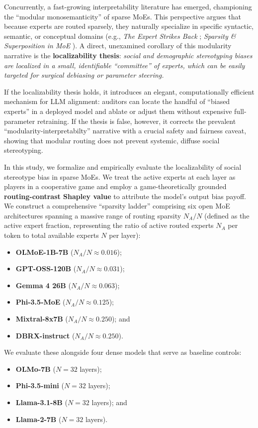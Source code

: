 \documentclass[11pt,a4paper]{article}
\begin{document}
Concurrently, a fast-growing interpretability literature has emerged, championing the ``modular monosemanticity'' of sparse MoEs. This perspective argues that because experts are routed sparsely, they naturally specialize in specific syntactic, semantic, or conceptual domains (e.g., \textit{The Expert Strikes Back} \cite{expert_strikes_back}; \textit{Sparsity \& Superposition in MoE} \cite{sparsity_superposition_moe}). A direct, unexamined corollary of this modularity narrative is the \textbf{localizability thesis}: \textit{social and demographic stereotyping biases are localized in a small, identifiable ``committee'' of experts, which can be easily targeted for surgical debiasing or parameter steering.}

If the localizability thesis holds, it introduces an elegant, computationally efficient mechanism for LLM alignment: auditors can locate the handful of ``biased experts'' in a deployed model and ablate or adjust them without expensive full-parameter retraining. If the thesis is false, however, it corrects the prevalent ``modularity-interpretabilty'' narrative with a crucial safety and fairness caveat, showing that modular routing does not prevent systemic, diffuse social stereotyping.

In this study, we formalize and empirically evaluate the localizability of social stereotype bias in sparse MoEs. We treat the active experts at each layer as players in a cooperative game and employ a game-theoretically grounded \textbf{routing-contrast Shapley value} to attribute the model's output bias payoff. We construct a comprehensive ``sparsity ladder'' comprising six open MoE architectures spanning a massive range of routing sparsity $N_A/N$ (defined as the active expert fraction, representing the ratio of active routed experts $N_A$ per token to total available experts $N$ per layer):
\begin{itemize}
    \item \textbf{OLMoE-1B-7B} ($N_A/N \approx 0.016$);
    \item \textbf{GPT-OSS-120B} ($N_A/N \approx 0.031$);
    \item \textbf{Gemma 4 26B} ($N_A/N \approx 0.063$);
    \item \textbf{Phi-3.5-MoE} ($N_A/N \approx 0.125$);
    \item \textbf{Mixtral-8x7B} ($N_A/N \approx 0.250$); and
    \item \textbf{DBRX-instruct} ($N_A/N \approx 0.250$).
\end{itemize}
We evaluate these alongside four dense models that serve as baseline controls:
\begin{itemize}
    \item \textbf{OLMo-7B} ($N = 32$ layers);
    \item \textbf{Phi-3.5-mini} ($N = 32$ layers);
    \item \textbf{Llama-3.1-8B} ($N = 32$ layers); and
    \item \textbf{Llama-2-7B} ($N = 32$ layers).
\end{itemize}
\end{document}
